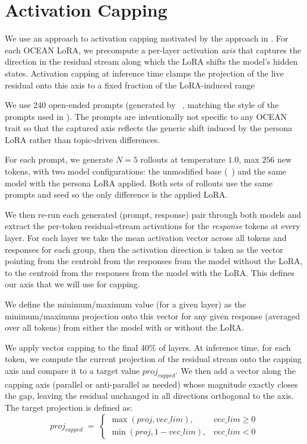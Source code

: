 \section{Activation Capping}\label{sec:activation_capping}

We use an approach to activation capping motivated by the approach in \citet{lu2026assistant}. For each OCEAN LoRA, we precompute a per-layer activation \emph{axis}
that captures the direction in the residual stream along which the LoRA
shifts the model's hidden states. Activation capping at inference time
clamps the projection of the live residual onto this axis to a fixed
fraction of the LoRA-induced range

We use 240 open-ended prompts (generated by \ClaudeOpusFourPointSeven~\citep{anthropic2026claudeopus47}, matching the style of the prompts used in \citet{lu2026assistant}). The prompts are intentionally not specific to any OCEAN trait
so that the captured axis reflects the generic shift induced by the
persona LoRA rather than topic-driven differences.

For each prompt, we generate $N=5$ rollouts at
temperature $1.0$, max $256$ new tokens, with two model configurations:
the unmodified base (\LlamaThreePointOneSizeEightBInstruct~\citep{grattafiori2024llama}) and the same model with the
persona LoRA applied. Both sets of rollouts use the same prompts and seed
so the only difference is the applied LoRA.

We then re-run each generated
(prompt, response) pair through both models and extract the per-token
residual-stream activations for the \emph{response} tokens at every
layer. For each layer we take the mean activation vector across all tokens and responses for each group, then the activation direction is taken as the vector pointing from the centroid from the responses from the model without the LoRA, to the centroid from the responses from the model with the LoRA. This defines our axis that we will use for capping.

We define the minimum/maximum value (for a given layer) as the minimum/maximum projection onto this vector for any given response (averaged over all tokens) from either the model with or without the LoRA.

We apply vector capping to the final 40\% of layers. At inference time, for each token, we compute the current projection of the residual stream onto the capping axis and compare it to a target value $proj_{capped}$. We then add a vector along the capping axis (parallel or anti-parallel as needed) whose magnitude exactly closes the gap, leaving the residual unchanged in all directions orthogonal to the axis. The target projection is defined as:
\[
  proj_{capped} \;=\;
  \begin{cases}
    \max(proj, vec\_lim), & vec\_lim \geq 0\\
    \min(proj, 1 - vec\_lim), & vec\_lim < 0
  \end{cases}
\]

